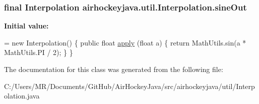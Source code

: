 \subsubsection[{sine\+Out}]{\setlength{\rightskip}{0pt plus 5cm}final {\bf Interpolation} airhockeyjava.\+util.\+Interpolation.\+sine\+Out\hspace{0.3cm}{\ttfamily [static]}}\label{classairhockeyjava_1_1util_1_1_interpolation_afd179f4560af6c61a41c58a82188d1d4}
{\bfseries Initial value\+:}
\begin{DoxyCode}
= \textcolor{keyword}{new} Interpolation() \{
        \textcolor{keyword}{public} \textcolor{keywordtype}{float} \hyperlink{classairhockeyjava_1_1util_1_1_interpolation_a21c50444fd69302dcf68703cb0d261ca}{apply} (\textcolor{keywordtype}{float} a) \{
            \textcolor{keywordflow}{return} MathUtils.sin(a * MathUtils.PI / 2);
        \}
    \}
\end{DoxyCode}


The documentation for this class was generated from the following file\+:\begin{DoxyCompactItemize}
\item 
C\+:/\+Users/\+M\+R/\+Documents/\+Git\+Hub/\+Air\+Hockey\+Java/src/airhockeyjava/util/Interpolation.\+java\end{DoxyCompactItemize}
